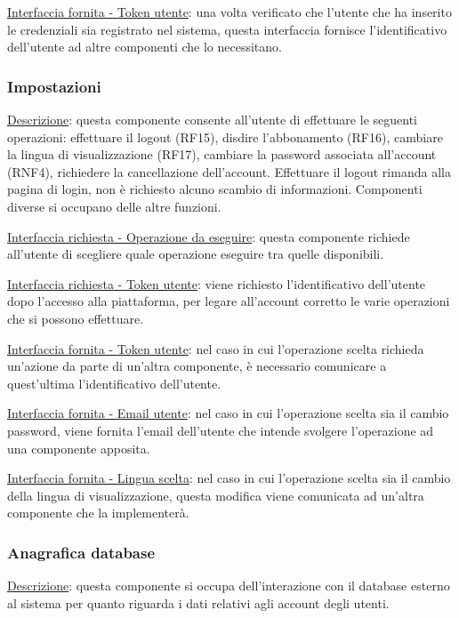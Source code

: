 \documentclass[a4paper,12pt]{article}
\begin{document}
\underline{Interfaccia fornita - Token utente}: una volta verificato che l’utente che ha inserito le credenziali sia registrato nel sistema, questa interfaccia fornisce l’identificativo dell’utente ad altre componenti che lo necessitano.

\subsubsection{Impostazioni}

\underline{Descrizione}: questa componente consente all’utente di effettuare le seguenti operazioni: effettuare il logout (RF15), disdire l’abbonamento (RF16), cambiare la lingua di visualizzazione (RF17), cambiare la password associata all’account (RNF4), richiedere la cancellazione dell'account. Effettuare il logout rimanda alla pagina di login, non è richiesto alcuno scambio di informazioni. Componenti diverse si occupano delle altre funzioni.

\underline{Interfaccia richiesta - Operazione da eseguire}: questa componente richiede all’utente di scegliere quale operazione eseguire tra quelle disponibili.

\underline{Interfaccia richiesta - Token utente}: viene richiesto l’identificativo dell’utente dopo l’accesso alla piattaforma, per legare all’account corretto le varie operazioni che si possono effettuare.

\underline{Interfaccia fornita - Token utente}: nel caso in cui l’operazione scelta richieda un’azione da parte di un’altra componente, è necessario comunicare a quest’ultima l’identificativo dell’utente.

\underline{Interfaccia fornita - Email utente}: nel caso in cui l’operazione scelta sia il cambio password, viene fornita l’email dell’utente che intende svolgere l’operazione ad una componente apposita.

\underline{Interfaccia fornita - Lingua scelta}: nel caso in cui l’operazione scelta sia il cambio della lingua di visualizzazione, questa modifica viene comunicata ad un’altra componente che la implementerà.

\subsubsection{Anagrafica database}

\underline{Descrizione}: questa componente si occupa dell’interazione con il database esterno al sistema per quanto riguarda i dati relativi agli account degli utenti.
\end{document}
